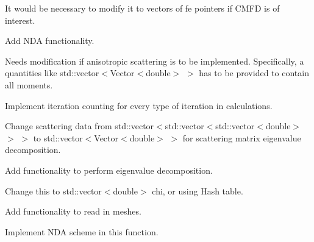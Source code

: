 
\begin{DoxyRefList}
\item[\label{todo__todo000001}%
\Hypertarget{todo__todo000001}%
Member \hyperlink{class_bart_driver_ac2e63d4ab8a403649e19f4b1acf94c04}{Bart\+Driver$<$ dim $>$\+:\+:fe} ]It would be necessary to modify it to vectors of fe pointers if C\+M\+FD is of interest.  
\item[\label{todo__todo000002}%
\Hypertarget{todo__todo000002}%
Member \hyperlink{class_eigen_base_a8a9ef8878e5b7199aa662f2b61b2d864}{Eigen\+Base$<$ dim $>$\+:\+:do\+\_\+iterations} (std\+::vector$<$ Vector$<$ double $>$ $>$ \&sflxes\+\_\+proc, std\+::vector$<$ std\+\_\+cxx11\+::shared\+\_\+ptr$<$ Equation\+Base$<$ dim $>$ $>$ $>$ \&equ\+\_\+ptrs, std\+\_\+cxx11\+::shared\+\_\+ptr$<$ I\+G\+Base$<$ dim $>$ $>$ ig\+\_\+ptr, std\+\_\+cxx11\+::shared\+\_\+ptr$<$ M\+G\+Base$<$ dim $>$ $>$ mg\+\_\+ptr)]Add N\+DA functionality.  
\item[\label{todo__todo000003}%
\Hypertarget{todo__todo000003}%
Member \hyperlink{class_i_g_base_a0a301d6077cb7c94ab0942ab3d5082a5}{I\+G\+Base$<$ dim $>$\+:\+:sflx\+\_\+proc\+\_\+prev\+\_\+ig} ]Needs modification if anisotropic scattering is to be implemented. Specifically, a quantities like std\+::vector$<$Vector$<$double$>$ $>$ has to be provided to contain all moments.  
\item[\label{todo__todo000004}%
\Hypertarget{todo__todo000004}%
Class \hyperlink{class_iteration_base}{Iteration\+Base$<$ dim $>$} ]Implement iteration counting for every type of iteration in calculations.  
\item[\label{todo__todo000007}%
\Hypertarget{todo__todo000007}%
Class \hyperlink{class_material_properties}{Material\+Properties} ]Change scattering data from std\+::vector$<$std\+::vector$<$std\+::vector$<$double$>$ $>$ $>$ to std\+::vector$<$Vector$<$double$>$ $>$ for scattering matrix eigenvalue decomposition. 

Add functionality to perform eigenvalue decomposition.  
\item[\label{todo__todo000008}%
\Hypertarget{todo__todo000008}%
Member \hyperlink{class_material_properties_afb25f14545f97c91dacfffcae9d0dcf3}{Material\+Properties\+:\+:all\+\_\+chi} ]Change this to std\+::vector$<$double$>$ chi, or using Hash table.  
\item[\label{todo__todo000006}%
\Hypertarget{todo__todo000006}%
Member \hyperlink{class_mesh_generator_a27c6ff0b0c51700373ef9a1dc10abaaf}{Mesh\+Generator$<$ dim $>$\+:\+:make\+\_\+grid} (parallel\+::distributed\+::\+Triangulation$<$ dim $>$ \&tria)]Add functionality to read in meshes. 
\item[\label{todo__todo000005}%
\Hypertarget{todo__todo000005}%
Member \hyperlink{class_m_g_base_a3586c47d901608bc42792c6de456b1cb}{M\+G\+Base$<$ dim $>$\+:\+:do\+\_\+iterations} (std\+::vector$<$ Vector$<$ double $>$ $>$ \&sflxes\+\_\+proc, std\+::vector$<$ std\+\_\+cxx11\+::shared\+\_\+ptr$<$ Equation\+Base$<$ dim $>$ $>$ $>$ \&equ\+\_\+ptrs, std\+\_\+cxx11\+::shared\+\_\+ptr$<$ I\+G\+Base$<$ dim $>$ $>$ ig\+\_\+ptr)]Implement N\+DA scheme in this function.
\end{DoxyRefList}